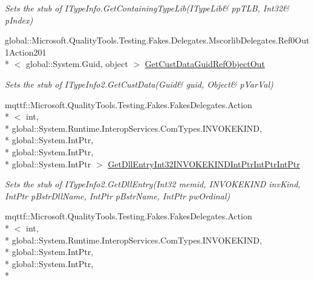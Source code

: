 \begin{DoxyCompactItemize}
\begin{DoxyCompactList}\small\item\em Sets the stub of I\-Type\-Info.\-Get\-Containing\-Type\-Lib(I\-Type\-Lib\& pp\-T\-L\-B, Int32\& p\-Index)\end{DoxyCompactList}\item 
global\-::\-Microsoft.\-Quality\-Tools.\-Testing.\-Fakes.\-Delegates.\-Mscorlib\-Delegates.\-Ref0\-Out1\-Action201\\*
$<$ global\-::\-System.\-Guid, object $>$ \hyperlink{class_system_1_1_runtime_1_1_interop_services_1_1_com_types_1_1_fakes_1_1_stub_i_type_info2_a4e45872ff4ccf4bf1ef8fc2cca2e2864}{Get\-Cust\-Data\-Guid\-Ref\-Object\-Out}
\begin{DoxyCompactList}\small\item\em Sets the stub of I\-Type\-Info2.\-Get\-Cust\-Data(Guid\& guid, Object\& p\-Var\-Val)\end{DoxyCompactList}\item 
mqttf\-::\-Microsoft.\-Quality\-Tools.\-Testing.\-Fakes.\-Fakes\-Delegates.\-Action\\*
$<$ int, \\*
global\-::\-System.\-Runtime.\-Interop\-Services.\-Com\-Types.\-I\-N\-V\-O\-K\-E\-K\-I\-N\-D, \\*
global\-::\-System.\-Int\-Ptr, \\*
global\-::\-System.\-Int\-Ptr, \\*
global\-::\-System.\-Int\-Ptr $>$ \hyperlink{class_system_1_1_runtime_1_1_interop_services_1_1_com_types_1_1_fakes_1_1_stub_i_type_info2_a9d2af107df7d2c40f1d9ae34604677c0}{Get\-Dll\-Entry\-Int32\-I\-N\-V\-O\-K\-E\-K\-I\-N\-D\-Int\-Ptr\-Int\-Ptr\-Int\-Ptr}
\begin{DoxyCompactList}\small\item\em Sets the stub of I\-Type\-Info2.\-Get\-Dll\-Entry(\-Int32 memid, I\-N\-V\-O\-K\-E\-K\-I\-N\-D inv\-Kind, Int\-Ptr p\-Bstr\-Dll\-Name, Int\-Ptr p\-Bstr\-Name, Int\-Ptr pw\-Ordinal)\end{DoxyCompactList}\item 
mqttf\-::\-Microsoft.\-Quality\-Tools.\-Testing.\-Fakes.\-Fakes\-Delegates.\-Action\\*
$<$ int, \\*
global\-::\-System.\-Runtime.\-Interop\-Services.\-Com\-Types.\-I\-N\-V\-O\-K\-E\-K\-I\-N\-D, \\*
global\-::\-System.\-Int\-Ptr, \\*
global\-::\-System.\-Int\-Ptr, \\*

\end{DoxyCompactItemize}
